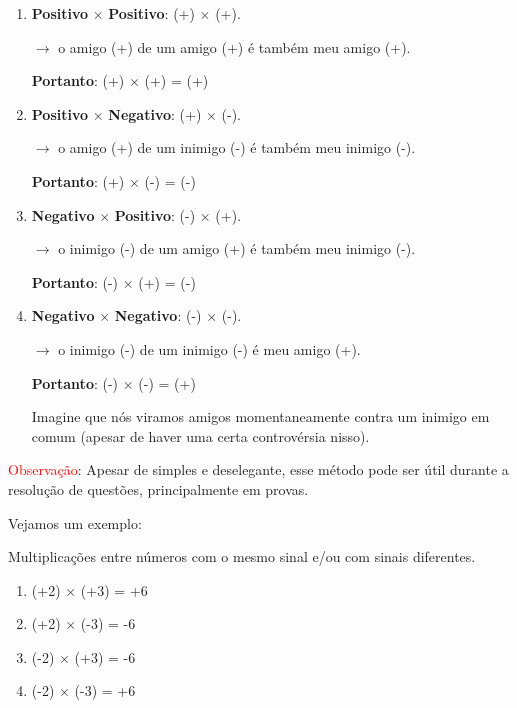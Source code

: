 \begin{enumerate}
    \item \textbf{Positivo} \(\times\) \textbf{Positivo}: (+) \(\times\) (+).
    
    \(\rightarrow\) o amigo (+) de um amigo (+) é também meu amigo (+). 

    \textbf{Portanto}: (+) \(\times\) (+) = (+)

    \item \textbf{Positivo} \(\times\) \textbf{Negativo}: (+) \(\times\) (-).
    
    \(\rightarrow\) o amigo (+) de um inimigo (-) é também meu inimigo (-). 

    \textbf{Portanto}: (+) \(\times\) (-) = (-)

    \item \textbf{Negativo} \(\times\) \textbf{Positivo}: (-) \(\times\) (+).
    
    \(\rightarrow\) o inimigo (-) de um amigo (+) é também meu inimigo (-). 

    \textbf{Portanto}: (-) \(\times\) (+) = (-)

    \item \textbf{Negativo} \(\times\) \textbf{Negativo}: (-) \(\times\) (-).
    
    \(\rightarrow\) o inimigo (-) de um inimigo (-) é meu amigo (+). 

    \textbf{Portanto}: (-) \(\times\) (-) = (+)

    Imagine que nós  viramos amigos momentaneamente contra um inimigo em comum (apesar de haver uma certa controvérsia nisso).
\end{enumerate}

\textcolor{red}{Observação}: Apesar de simples e deselegante, esse método pode ser útil durante a resolução de questões, principalmente em provas.

Vejamos um exemplo:

\begin{exemplo}
    Multiplicações entre números com o mesmo sinal e/ou com sinais diferentes.
    
    \begin{enumerate}
        \item (+2) \(\times\) (+3) = +6
        \item (+2) \(\times\) (-3) = -6
        \item (-2) \(\times\) (+3) = -6
        \item (-2) \(\times\) (-3) = +6
    \end{enumerate}
    
\end{exemplo}


